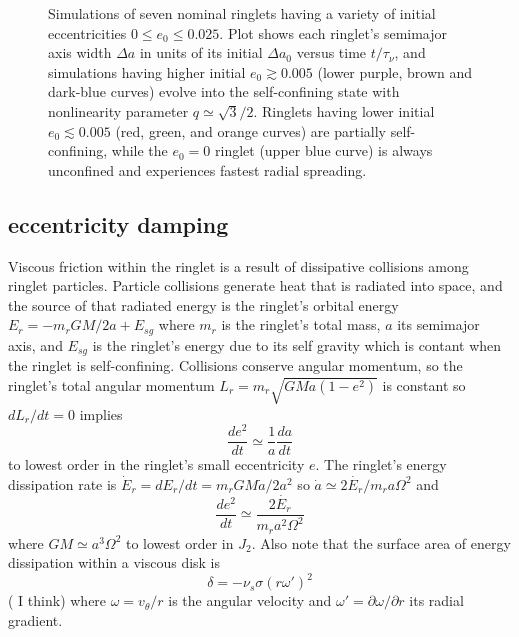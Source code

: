 \documentclass[preprint]{aastex62}
\begin{document}
\begin{figure}
    \caption{
        \label{fig:e0}
        Simulations of seven nominal ringlets having a variety of initial eccentricities $0\le e_0\le 0.025$.
        Plot shows each ringlet's semimajor axis width $\Delta a$ in units of its initial $\Delta a_0$
        versus time $t/\tau_\nu$, and simulations having higher initial $e_0\gtrsim0.005$ 
        (lower purple, brown and dark-blue curves) evolve into the self-confining state
        with nonlinearity parameter $q\simeq\sqrt{3}/2$. Ringlets having lower initial $e_0\lesssim0.005$
        (red, green, and orange curves) are partially self-confining, while the $e_0=0$ ringlet (upper blue curve)
        is always unconfined and experiences fastest radial spreading.
    }
\end{figure}

\subsection{eccentricity damping}
\label{subsec:eccentricity}

Viscous friction within the ringlet is a result of dissipative collisions among ringlet particles.
Particle collisions generate heat that is radiated into space, and the source of that radiated energy
is the ringlet's orbital energy $E_r=-m_rGM/2a + E_{sg}$ where $m_r$ is the ringlet's total
mass, $a$ its semimajor axis, and $E_{sg}$ is the ringlet's energy due to its self gravity
which is contant when the ringlet is self-confining. 
Collisions conserve angular momentum, so the ringlet's total angular momentum
$L_r=m_r\sqrt{GMa(1-e^2)}$ is constant so $dL_r/dt=0$ implies
\begin{equation}
    \label{eqn:e2-dot}
    \frac{de^2}{dt} \simeq \frac{1}{a}\frac{da}{dt}
\end{equation}
to lowest order in the ringlet's small eccentricity $e$.
The ringlet's energy dissipation rate is $\dot{E}_r = dE_r/dt=m_rGM\dot{a}/2a^2$ so
$\dot{a}\simeq2\dot{E_r}/m_ra\Omega^2$ and 
\begin{equation}
    \label{eqn:de2/dt}
    \frac{de^2}{dt} \simeq \frac{2\dot{E_r}}{m_r a^2\Omega^2}
\end{equation}
where $GM\simeq a^3\Omega^2$ to lowest order in $J_2$. Also note that
the surface area of energy dissipation within a viscous disk is
\begin{equation}
    \delta = -\nu_s\sigma(r\omega')^2
\end{equation}
(\citealt{P81} I think) where $\omega=v_\theta/r$ is the angular velocity and 
$\omega'=\partial\omega/\partial r$ its radial gradient.
\end{document}
